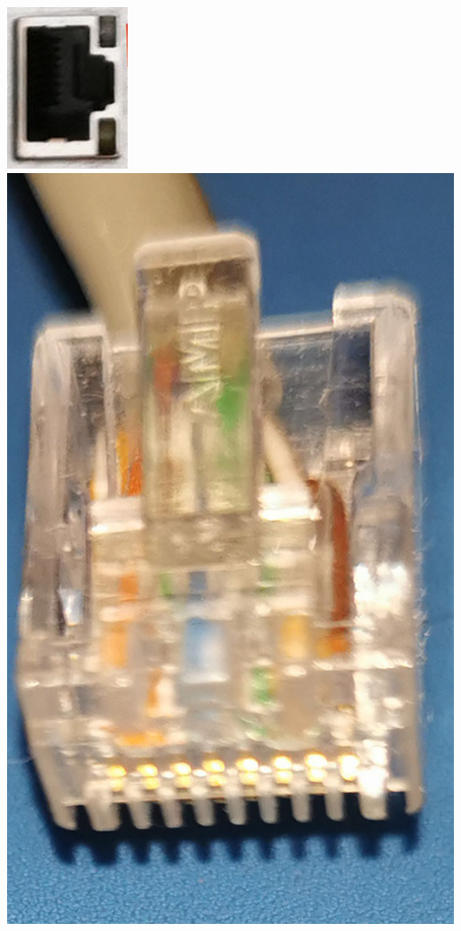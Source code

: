 \begin{center}
	\includegraphics[width=0.7\linewidth]{pic/RJ}\includegraphics[width=0.7\linewidth]{pic/RJL}
\end{center}\par
